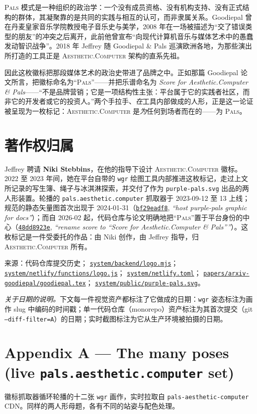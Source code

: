 \documentclass[10pt,letterpaper,twocolumn]{article}
\newcommand{\ac}{\textsc{Aesthetic}{\color{acpink}.}\textsc{Computer}}
\newcommand{\pals}{\textsc{Pals}}
\newcommand{\commit}[2]{\href{https://github.com/whistlegraph/aesthetic-computer/commit/#1}{\texttt{#1}}, \emph{``#2''}}
\newcommand{\repofile}[1]{\href{https://github.com/whistlegraph/aesthetic-computer/blob/main/#1}{\texttt{#1}}}
\begin{document}
\pals{} 模式是一种组织的政治学：一个没有成员资格、没有机构支持、没有正式结构的群体，其凝聚靠的是共同的实践与相互的认可，而非隶属关系。Goodiepal 曾在丹麦皇家音乐学院教授电子音乐史与美学，2008 年在一场被描述为“交了错误类型的朋友”的冲突之后离开，此前他曾宣布“向现代计算机音乐与媒体艺术中的愚蠢发动智识战争”。2018 年 Jeffrey 随 Goodiepal \& Pals 巡演欧洲各地，为那些演出所打造的工具正是 \ac{} 架构的直系先祖。

因此这枚徽标把那段媒体艺术的政治史带进了品牌之中。正如那篇 Goodiepal 论文所言，把徽标命名为“\pals{}”——并把乐谱命名为 \emph{Score for Aesthetic{\color{acpink}.}Computer \& Pals}——“不是品牌营销；它是一项结构性主张：平台属于它的实践者社区，而非它的开发者或它的投资人。”两个手拉手、\emph{在}工具内部做成的人形，正是这一论证被呈现为一枚标记：\ac{} 是\emph{为}任何到场者而在的——为 \pals{}。

\section{著作权归属}

Jeffrey 聘请 \textbf{Niki Stebbins}，在他的指导下设计 \ac{} 徽标。2022 至 2023 年间，她在平台自带的 \texttt{wgr} 绘图工具内部推进这枚标记，走过上文所记录的写生簿、绳子与冰淇淋探索，并交付了作为 \texttt{purple-pals.svg} 出品的两人形装置。轮播的 \texttt{pals.aesthetic.computer} 抓取器于 2023-09-12 至 13 上线；规范的静态矢量图首次出现于 2024-01-31（\commit{bf29eadf8}{host purple-pals graphic for docs}）；而自 2026-02 起，代码仓库与论文明确地把“\pals{}”置于平台身份的中心（\commit{48dd8923e}{rename score to ``Score for
Aesthetic.Computer \& Pals''}）。这枚标记是一件受委托的作品：由 Niki 创作，由 Jeffrey 指导，归 \ac{} 所有。

\vspace{0.6em}
{\footnotesize\color{acgray}\noindent 来源：代码仓库提交历史；
\repofile{system/backend/logo.mjs}；
\repofile{system/netlify/functions/logo.js}；
\repofile{system/netlify.toml}；
\repofile{papers/arxiv-goodiepal/goodiepal.tex}；
\repofile{system/public/purple-pals.svg}。\par}

\onecolumn
\appendix

\noindent\emph{关于日期的说明。}下文每一件视觉资产都标注了它做成的日期：\texttt{wgr} 姿态标注为画作 slug 中编码的时间戳；单一代码仓库（monorepo）资产标注为其首次提交（git
\texttt{--diff-filter=A}）的日期；实时截图标注为它从生产环境被拍摄的日期。

\section*{Appendix A --- The many poses (live \texttt{pals.aesthetic.computer} set)}
\noindent 徽标抓取器循环轮播的十二张 \texttt{wgr} 画作，实时拉取自 \texttt{pals-aesthetic-computer} CDN。同样的两人形母题，各有不同的站姿与配色处理。
\vspace{1.2em}
\end{document}
